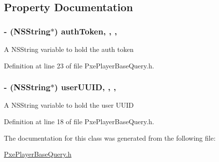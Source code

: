 \subsection{Property Documentation}
\hypertarget{interface_pxe_player_base_query_a49d8f664fabf9e51a73def504d460a63}{
\subsubsection[{auth\-Token}]{\setlength{\rightskip}{0pt plus 5cm}-\/ (N\-S\-String$\ast$) auth\-Token\hspace{0.3cm}{\ttfamily [read]}, {\ttfamily [write]}, {\ttfamily [nonatomic]}, {\ttfamily [strong]}}}\label{interface_pxe_player_base_query_a49d8f664fabf9e51a73def504d460a63}
A N\-S\-String variable to hold the auth token 

Definition at line 23 of file Pxe\-Player\-Base\-Query.\-h.

\hypertarget{interface_pxe_player_base_query_a767888800e1aa6448405207e57ab4c9b}{
\subsubsection[{user\-U\-U\-I\-D}]{\setlength{\rightskip}{0pt plus 5cm}-\/ (N\-S\-String$\ast$) user\-U\-U\-I\-D\hspace{0.3cm}{\ttfamily [read]}, {\ttfamily [write]}, {\ttfamily [nonatomic]}, {\ttfamily [strong]}}}\label{interface_pxe_player_base_query_a767888800e1aa6448405207e57ab4c9b}
A N\-S\-String variable to hold the user U\-U\-I\-D 

Definition at line 18 of file Pxe\-Player\-Base\-Query.\-h.



The documentation for this class was generated from the following file\-:\begin{DoxyCompactItemize}
\item 
\hyperlink{_pxe_player_base_query_8h}{Pxe\-Player\-Base\-Query.\-h}\end{DoxyCompactItemize}
